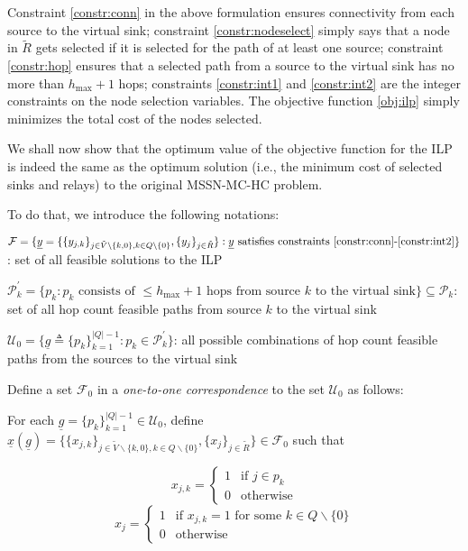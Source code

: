 \documentclass[conference]{IEEEtran}
\newcommand{\Rt}{\tilde{R}}
\newcommand{\Vt}{\tilde{V}}
\newcommand{\F}{\mathcal{F}}
\newcommand{\U}{\mathcal{U}}
\renewcommand{\P}{\mathcal{P}}
\begin{document}
Constraint \eqref{constr:conn} in the above formulation ensures connectivity from each source to the virtual sink; constraint \eqref{constr:nodeselect} simply says that a node in $\Rt$ gets selected if it is selected for the path of at least one source; constraint \eqref{constr:hop} ensures that a selected path from a source to the virtual sink has no more than $h_{\max}+1$ hops; constraints \eqref{constr:int1} and \eqref{constr:int2} are the integer constraints on the node selection variables. The objective function \eqref{obj:ilp} simply minimizes the total cost of the nodes selected.

We shall now show that the optimum value of the objective function for the ILP is indeed the same as the optimum solution (i.e., the minimum cost of selected sinks and relays) to the original MSSN-MC-HC problem.

To do that, we introduce the following notations:

\begin{description}
\item $\F = \{\underline{y}=\{\{y_{j,k}\}_{j\in \Vt\backslash\{k,0\},k\in Q\backslash\{0\}},\{y_j\}_{j\in \Rt}\}: \underline{y} \text{ satisfies constraints \eqref{constr:conn}-\eqref{constr:int2}}\}$: set of all feasible solutions to the ILP

\item $\P_k^{'} = \{p_k: \text{$p_k$ consists of $\leq h_{\max}+1$ hops from source $k$ to the virtual sink}\}\subseteq \P_k$: set of all hop count feasible paths from source $k$ to the virtual sink

\item $\U_0 = \{\underline{g}\triangleq \{p_k\}_{k=1}^{|Q|-1}: p_k\in \P_k^{'}\}$: all possible combinations of hop count feasible paths from the sources to the virtual sink
\end{description}

Define a set $\F_0$ in a \emph{one-to-one correspondence} to the set $\U_0$ as follows:

For each $\underline{g}=\{p_k\}_{k=1}^{|Q|-1}\in \U_0$, define $\underline{x}(\underline{g})=\{\{x_{j,k}\}_{j\in \Vt\backslash\{k,0\},k\in Q\backslash\{0\}},\{x_j\}_{j\in \Rt}\}\in\F_0$ such that

\begin{equation*}
x_{j,k}=\left\{
\begin{array}{rl}
1 & \text{if $j\in p_k$}\\
0 & \text{otherwise}
\end{array}\right.
\end{equation*}
\begin{equation*}
x_{j}=\left\{
\begin{array}{rl}
1 & \text{if $x_{j,k}=1$ for some $k\in Q\backslash\{0\}$}\\
0 & \text{otherwise}
\end{array}\right.
\end{equation*}
\end{document}

